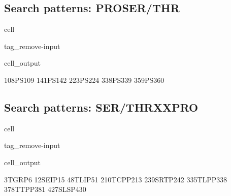 \documentclass[letterpaper,10pt,english]{jupyterBook}
\begin{document}
\subsection{Search patterns: PRO\sphinxhyphen{}SER/THR}
\label{\detokenize{ipynb/chapter2:search-patterns-pro-ser-thr}}
\begin{sphinxuseclass}{cell}
\begin{sphinxuseclass}{tag_remove-input}\begin{sphinxVerbatimOutput}

\begin{sphinxuseclass}{cell_output}
\begin{sphinxVerbatim}[commandchars=\\\{\}]
108\PYGZhy{}PS\PYGZhy{}109
141\PYGZhy{}PS\PYGZhy{}142
223\PYGZhy{}PS\PYGZhy{}224
338\PYGZhy{}PS\PYGZhy{}339
359\PYGZhy{}PS\PYGZhy{}360
\end{sphinxVerbatim}

\end{sphinxuseclass}\end{sphinxVerbatimOutput}

\end{sphinxuseclass}
\end{sphinxuseclass}

\subsection{Search patterns: SER/THR\sphinxhyphen{}X\sphinxhyphen{}X\sphinxhyphen{}PRO}
\label{\detokenize{ipynb/chapter2:search-patterns-ser-thr-x-x-pro}}
\begin{sphinxuseclass}{cell}
\begin{sphinxuseclass}{tag_remove-input}\begin{sphinxVerbatimOutput}

\begin{sphinxuseclass}{cell_output}
\begin{sphinxVerbatim}[commandchars=\\\{\}]
3\PYGZhy{}TGRP\PYGZhy{}6
12\PYGZhy{}SEIP\PYGZhy{}15
48\PYGZhy{}TLIP\PYGZhy{}51
210\PYGZhy{}TCPP\PYGZhy{}213
239\PYGZhy{}SRTP\PYGZhy{}242
335\PYGZhy{}TLPP\PYGZhy{}338
378\PYGZhy{}TTPP\PYGZhy{}381
427\PYGZhy{}SLSP\PYGZhy{}430
\end{sphinxVerbatim}

\end{sphinxuseclass}\end{sphinxVerbatimOutput}

\end{sphinxuseclass}
\end{sphinxuseclass}
\end{document}
